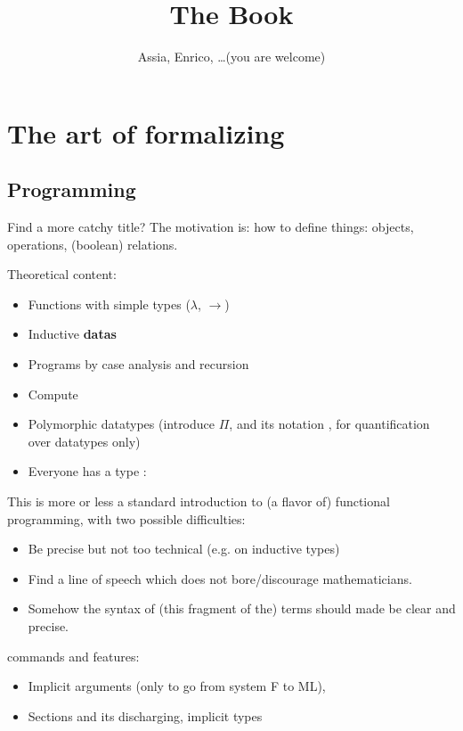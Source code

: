 \documentclass{book}
\title{The Book}
\author{Assia, Enrico, \ldots (you are welcome)}
\begin{document}
\maketitle
\tableofcontents{}





\part{The art of formalizing}


\chapter{Programming}

Find a more catchy title? The motivation is: how to define things:
objects, operations, (boolean) relations.

Theoretical content:
\begin{itemize}
\item Functions with simple types ($\lambda$, $\rightarrow$)
\item Inductive {\bf datas}
\item Programs by case analysis and recursion
\item Compute
\item Polymorphic datatypes (introduce $\Pi$, and its \Coq{} notation
  , for quantification over datatypes only)
\item Everyone has a type : 
\end{itemize}
This is more or less a standard introduction to (a flavor of)
functional programming, with two possible difficulties:
\begin{itemize}
\item Be precise but not too technical (e.g. on inductive types)
\item Find a line of speech which does not bore/discourage
  mathematicians.
\item Somehow the syntax of (this fragment of the) terms should made
  be clear and precise.
\end{itemize}

\Coq{} commands and features:
\begin{itemize}
\item Implicit arguments (only to go from system F to ML), 
\item Sections and its discharging, implicit types
\end{itemize}
\end{document}
